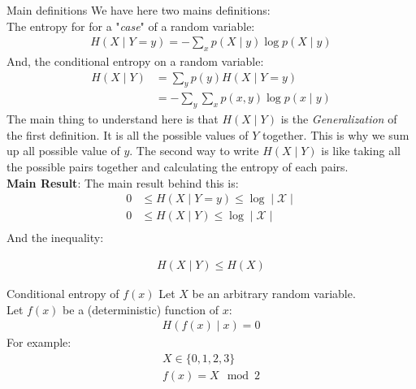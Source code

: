\begin{parag}{Main definitions}
    We have here two mains definitions:
    \\
    The entropy for for a "\textit{case}" of a random variable:
    \begin{align*}
        H(X \mid  Y = y) = - \sum_x p(X \mid  y) \log p(X \mid y)
    \end{align*}
    And, the conditional entropy on a random variable:
    \begin{align*}
        H(X \mid  Y) &= \sum_y p(y) H(X \mid  Y = y) \\
                     &= - \sum_y \sum_x p(x, y) \log p(x \mid  y)
    \end{align*}
    The main thing to understand here is that $H(X \mid  Y)$ is the \textit{Generalization} of the first definition. It is all the possible values of $Y$ together. This is why we sum up all possible value of $y$. The second way to write $H(X \mid  Y)$ is like taking all the possible pairs together and calculating the entropy of each pairs.
    \\
    \textbf{Main Result}: The main result behind this is:
    \begin{align*}
        0 &\leq H(X \mid  Y = y) \leq \log \mid \mathcal{X} \mid \\
        0 &\leq H(X \mid Y) \leq \log \mid  \mathcal{X} \mid \\
    \end{align*}
    And the inequality:
    \begin{formule}
        \begin{align*}
            H(X \mid  Y) \leq H(X)
        \end{align*}
    \end{formule}
   \begin{subparag}{Conditional entropy of $f(x)$}
       Let $X$ be an arbitrary random variable.
       \\
       Let $f(x)$ be a (deterministic) function of $x$:
       \begin{align*}
           H(f(x) \mid  x) = 0
       \end{align*}
       For example:
       \begin{align*}
           X \in \{0, 1, 2, 3\} \\
           f(x) = X \mod 2
       \end{align*}
       

\end{subparag}
\end{parag}
